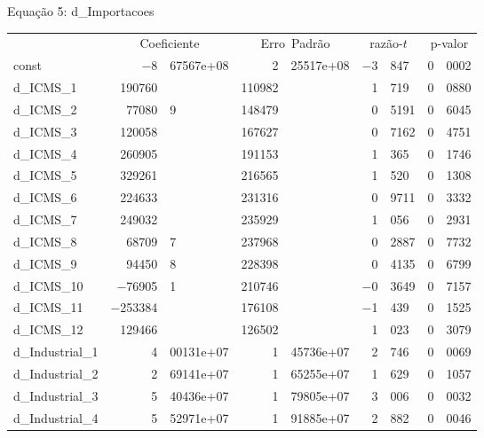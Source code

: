 \documentclass[11pt]{article}
\begin{document}
\begin{center}

Equação 5: d\_Importacoes\\

\vspace{1em}

\begin{tabular}{lr@{,}lr@{,}lr@{,}lr@{,}l}
  &
 \multicolumn{2}{c}{Coeficiente} &
  \multicolumn{2}{c}{Erro\ Padrão} &
   \multicolumn{2}{c}{razão-$t$} &
    \multicolumn{2}{c}{p-valor} \\[1ex]
const &
  $-$8&67567\textrm{e+08} &
    2&25517\textrm{e+08} &
      $-$3&847 &
        0&0002 \\
d\_ICMS\_1 &
  190760& &
    110982& &
      1&719 &
        0&0880 \\
d\_ICMS\_2 &
  77080&9 &
    148479& &
      0&5191 &
        0&6045 \\
d\_ICMS\_3 &
  120058& &
    167627& &
      0&7162 &
        0&4751 \\
d\_ICMS\_4 &
  260905& &
    191153& &
      1&365 &
        0&1746 \\
d\_ICMS\_5 &
  329261& &
    216565& &
      1&520 &
        0&1308 \\
d\_ICMS\_6 &
  224633& &
    231316& &
      0&9711 &
        0&3332 \\
d\_ICMS\_7 &
  249032& &
    235929& &
      1&056 &
        0&2931 \\
d\_ICMS\_8 &
  68709&7 &
    237968& &
      0&2887 &
        0&7732 \\
d\_ICMS\_9 &
  94450&8 &
    228398& &
      0&4135 &
        0&6799 \\
d\_ICMS\_10 &
  $-$76905&1 &
    210746& &
      $-$0&3649 &
        0&7157 \\
d\_ICMS\_11 &
  $-$253384& &
    176108& &
      $-$1&439 &
        0&1525 \\
d\_ICMS\_12 &
  129466& &
    126502& &
      1&023 &
        0&3079 \\
d\_Industrial\_1 &
  4&00131\textrm{e+07} &
    1&45736\textrm{e+07} &
      2&746 &
        0&0069 \\
d\_Industrial\_2 &
  2&69141\textrm{e+07} &
    1&65255\textrm{e+07} &
      1&629 &
        0&1057 \\
d\_Industrial\_3 &
  5&40436\textrm{e+07} &
    1&79805\textrm{e+07} &
      3&006 &
        0&0032 \\
d\_Industrial\_4 &
  5&52971\textrm{e+07} &
    1&91885\textrm{e+07} &
      2&882 &
        0&0046 \\

\end{tabular}
\end{center}
\end{document}
